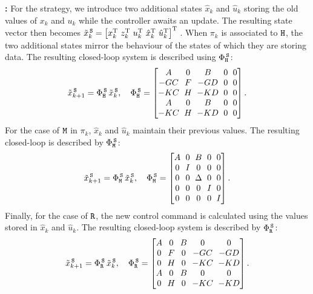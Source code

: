 \textbf{\tS{}: }%
%
For the \tS{} strategy, we introduce two additional states $\hat x_k$ and $\hat u_k$ storing the old values of $x_k$ and $u_k$ while the controller awaits an update.
The resulting state vector then becomes $\tilde x_k^{\,\texttt{S}} = \left[ x_k^{\mathrm{\small{T}}}{}\,\,z_k^{\mathrm{\small{T}}}{}\,\, u_k^{\mathrm{\small{T}}}{}\,\, \hat{x}_k^{\mathrm{\small{T}}}{}\,\, \hat{u}_k^{\mathrm{\small{T}}}{} \right]^{\mathrm{\small{T}}}{}$.
When $\pi_k$ is associated to $\texttt{H}$, the two additional states mirror the behaviour of the states of which they are storing data.
The resulting closed-loop system is described using $\Phi{}^{\,\texttt{S}}_{\texttt{H}}$:
\begin{equation*}
    \setlength\arraycolsep{3pt}
    \tilde x_{k+1}^{\,\Skip} = \clmat{}^{\,\Skip}_{\cH}\,\tilde x_k^{\,\Skip}, \quad
    \clmat{}^{\,\Skip}_{\cH} = \begin{bmatrix}
        \Ap       & 0    & \Bp      & 0 & 0 \\
        -\Bc\Cp   & \Ac  & -\Bc\Dp  & 0 & 0 \\
        -\Dc\Cp   & \Cc  & -\Dc\Dp  & 0 & 0 \\
        \Ap       & 0    & \Bp      & 0 & 0 \\
        -\Dc\Cp   & \Cc  & -\Dc\Dp  & 0 & 0 \\
    \end{bmatrix}.
\end{equation*}
%
For the case of $\texttt{M}$ in $\pi_k$, $\hat x_k$ and $\hat u_k$ maintain their previous values. The
resulting closed-loop is described by $\Phi{}^{\,\texttt{S}}_{\texttt{M}}$:
%
\begin{equation*}
    \setlength\arraycolsep{3pt}
    \tilde x_{k+1}^{\,\Skip} = \clmat{}^{\,\Skip}_{\cM}\,\tilde x_k^{\,\Skip}, \quad
    \clmat{}^{\,\Skip}_{\cM}=\begin{bmatrix}
        \Ap & 0  & \Bp & 0 & 0 \\
        0   & I  & 0   & 0 & 0 \\
        0   & 0  & \Delta   & 0 & 0 \\
        0   & 0  & 0   & I & 0 \\
        0   & 0  & 0   & 0 & I \\
	\end{bmatrix}.
\end{equation*}
%
Finally, for the case of $\texttt{R}$, the new control command is calculated using the values stored in $\hat x_k$ and $\hat u_k$.
The resulting closed-loop system is described by $\Phi{}^{\,\texttt{S}}_{\texttt{R}}$:
%
\begin{equation*}
    \setlength\arraycolsep{3pt}
    \tilde x_{k+1}^{\,\Skip} = \clmat{}^{\,\Skip}_{\cR} \, \tilde x_{k}^{\,\Skip},\quad
    \clmat{}^{\,\Skip}_{\cR} = \begin{bmatrix}
        \Ap & 0    & \Bp & 0       & 0 \\
        0   & \Ac  & 0   & -\Bc\Cp & -\Bc\Dp \\
        0   & \Cc  & 0   & -\Dc\Cp & -\Dc\Dp \\
        \Ap & 0    & \Bp & 0       & 0 \\
        0   & \Cc  & 0   & -\Dc\Cp & -\Dc\Dp \\
    \end{bmatrix}.
\end{equation*}
